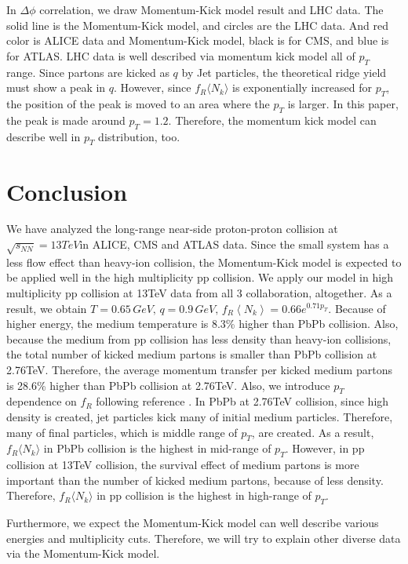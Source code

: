 \documentclass[12pt]{article}
\begin{document}
In $\Delta\phi$ correlation, we draw Momentum-Kick model result and LHC data. 
The solid line is the Momentum-Kick model, and circles are the LHC data. And red color is ALICE data and Momentum-Kick model, 
black is for CMS, and blue is for ATLAS. LHC data is well described via momentum kick model all of $p_T$ range.
Since partons are kicked as $q$ by Jet particles, the theoretical ridge yield must show a peak in $q$. 
However, since $f_R \langle N_k \rangle $ is exponentially increased for $p_T$, the position of the peak is moved to an area where the $p_T$ is larger. 
In this paper, the peak is made around $p_T=1.2$. Therefore, the momentum kick model can describe well in $p_T$ distribution, too.


\section*{Conclusion}


We have analyzed the long-range near-side proton-proton collision at $\sqrt{s_{NN}}=13TeV $in ALICE, CMS and ATLAS data. 
Since the small system has a less flow effect than heavy-ion collision, the Momentum-Kick model is expected to be applied well in the high multiplicity pp collision. 
We apply our model in high multiplicity pp collision at 13TeV data from all 3 collaboration, altogether. 
As a result, we obtain $T=0.65\, GeV,\, q=0.9\, GeV,\, f_R\left\langle N_k\right\rangle=0.66e^{0.71p_T}$.
Because of higher energy, the medium temperature is 8.3\% higher than PbPb collision.
Also, because the medium from pp collision has less density than heavy-ion collisions, the total number of kicked medium partons is smaller than PbPb collision at 2.76TeV.
Therefore, the average momentum transfer per kicked medium partons is 28.6\% higher than PbPb collision at 2.76TeV.
Also, we introduce $p_T$ dependence on $f_R$ following reference \cite{PbPb}.
In PbPb at 2.76TeV collision, since high density is created, jet particles kick many of initial medium particles.
Therefore, many of final particles, which is middle range of $p_T$, are created.
As a result, $f_R \langle N_k \rangle$ in PbPb collision is the highest in mid-range of $p_T$.
However, in pp collision at 13TeV collision, the survival effect of medium partons is more important than the number of kicked medium partons, because of less density.
Therefore, $f_R \langle N_k \rangle$ in pp collision is the highest in high-range of $p_T$.

Furthermore, we expect the Momentum-Kick model can well describe various energies and multiplicity cuts. 
Therefore, we will try to explain other diverse data via the Momentum-Kick model.






% 
\end{document}
